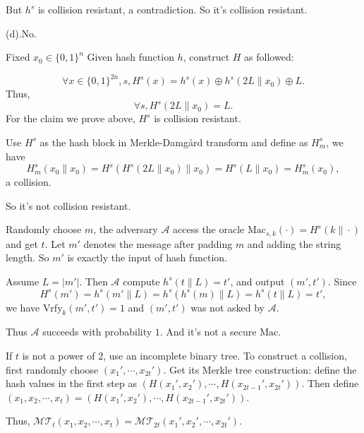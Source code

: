\documentclass[a4paper]{article}
\newcommand{\Mac}{\text{Mac}}
\newcommand{\Vrfy}{\text{Vrfy}}
\newcommand{\A}{\mathcal{A}}
\newenvironment{problem}[2][Problem]{\begin{trivlist}
\item[\hskip \labelsep {\bfseries #1}\hskip \labelsep {\bfseries #2.}]}{\end{trivlist}}
\begin{document}
\begin{problem}{5.6}
\begin{itemize}
\end{itemize}
But $h^s$ is collision resistant, a contradiction.
So it's collision resistant.\par\vspace{3ex}
(d).No.\par
Fixed $x_0\in \{0,1\}^{n}$ Given hash function $h$, construct $H$ as followed:\par
$$\forall x\in\{0,1\}^{2n},s, H^s(x)=h^s(x)\oplus h^s(2L\|x_0)\oplus L.$$
Thus, $$\forall s, H^s(2L\|x_0)=L.$$
For the claim we prove above, $H^s$ is collision resistant.\par
Use $H^s$ as the hash block in Merkle-Damg\aa rd transform and define as $H_m^s$, we have $$H_m^s(x_0\|x_0)=H^s(H^s(2L\|x_0)\|x_0)=H^s(L\|x_0)=H_m^s(x_0),$$ a collision.\par
So it's not collision resistant.
\end{problem}
\begin{problem}{5.10(a)}
Randomly choose $m$, the adversary $\A$ access the oracle $\Mac_{s,k}(\cdot)=H^s(k\|\cdot)$ and get $t$. 
Let $m'$ denotes the message after padding $m$ and adding the string length. So $m'$ is exactly the input of hash function.\par
Assume $L=|m'|$. Then $\A$ compute $h^s(t\|L)=t'$, and output $(m',t')$. 
Since $$H^s(m')=h^s(m'\|L)=h^s(h^s(m)\|L)=h^s(t\|L)=t',$$ we have 
$\Vrfy_k(m',t')=1$ and $(m',t')$ was not asked by $\A$.\par
Thus $\A$ succeeds with probability $1$. And it's not a secure $\Mac$.
\end{problem}
\begin{problem}{5.13}
If $t$ is not a power of $2$, use an incomplete binary tree. To construct a collision, first randomly choose $(x_1',\cdots,x_{2t}')$. Get its Merkle tree construction: define the hash values in the first step as $(H(x_1',x_2'),\cdots,H(x_{2t-1}',x_{2t}'))$. Then define $(x_1,x_2,\cdots,x_t)=(H(x_1',x_2'),\cdots,H(x_{2t-1}',x_{2t}'))$. \par
Thus, $\mathcal{MT}_t(x_1,x_2,\cdots,x_t)=\mathcal{MT}_{2t}(x_1',x_2',\cdots,x_{2t}')$.
\end{problem}
\end{document}
